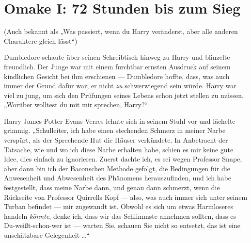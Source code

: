 \section{Omake I: 72 Stunden bis zum Sieg}

(Auch bekannt als
„Was passiert, wenn du Harry veränderst, aber alle anderen Charaktere gleich lässt“)

Dumbledore schaute über seinen Schreibtisch hinweg zu Harry und blinzelte freundlich. Der Junge war mit einem furchtbar ernsten Ausdruck auf seinem kindlichen Gesicht bei ihm erschienen — Dumbledore hoffte, dass, was auch immer der Grund dafür war, er nicht \emph{zu} schwerwiegend sein würde. Harry war viel zu jung, um sich den Prüfungen seines Lebens schon jetzt stellen zu müssen.
„Worüber wolltest du mit mir sprechen, Harry?“

Harry James Potter-Evans-Verres lehnte sich in seinem Stuhl vor und lächelte grimmig.
„Schulleiter, ich habe einen stechenden Schmerz in meiner Narbe verspürt, als der Sprechende Hut die Häuser verkündete. In Anbetracht der Tatsache, wie und wo ich diese Narbe erhalten habe, schien es mir keine gute Idee, dies einfach zu ignorieren. Zuerst dachte ich, es sei wegen Professor Snape, aber dann bin ich der Baconschen Methode gefolgt, die Bedingungen für die Anwesenheit und Abwesenheit des Phänomens herauszufinden, und ich habe festgestellt, dass meine Narbe dann, und genau dann schmerzt, wenn die Rückseite von Professor Quirrells Kopf — also, was auch immer sich unter seinem Turban befindet — mir zugewandt ist. Obwohl es sich um etwas Harmloseres handeln \emph{könnte}, denke ich, dass wir das Schlimmste annehmen sollten, dass es Du-weißt-schon-wer ist — warten Sie, schauen Sie nicht so entsetzt, das ist eine unschätzbare Gelegenheit …“




